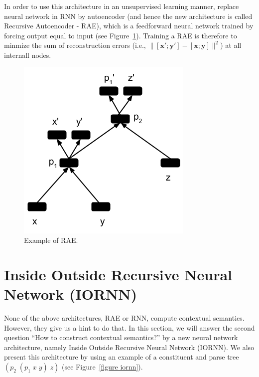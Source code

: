 \documentclass[11pt]{article}
\begin{document}
In order to use this architecture in an unsupervised learning manner, 
\cite{socher2011semi} replace neural network in RNN by autoencoder 
(and hence the new architecture is called Recursive Autoencoder - RAE), 
which is a feedforward neural network trained by forcing output equal to 
input (see Figure~\ref{figure rae}). Training a RAE is therefore to minmize 
the sum of reconstruction errors 
(i.e., $\|[\mathbf{x}';\mathbf{y}'] - [\mathbf{x};\mathbf{y}]\|^2$) at all internall nodes. 

\begin{figure}
	\center
	\includegraphics[scale=0.5]{RAE.png}
	\caption{Example of RAE.}
	\label{figure rae}
\end{figure}


\section{Inside Outside Recursive Neural Network (IORNN)}
\label{section nlm}

None of the above architectures, RAE or RNN, compute contextual semantics. 
However, they give us a hint to do that. In this section, we will answer the second 
question ``How to construct contextual semantics?'' by a new neural network 
architecture, namely Inside Outside Recursive Neural Network (IORNN). We also 
present this architecture by using an example of a constituent and parse tree 
$(p_2 \; (p_1 \; x \; y) \; z)$ (see Figure~\ref{figure iornn}).
\end{document}
